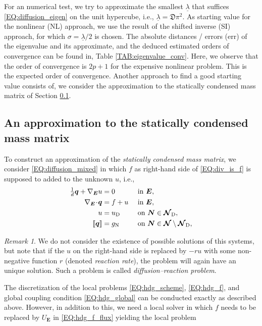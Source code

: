 \documentclass[a4paper, english, 12pt, reqno, draft]{amsart}
\theoremstyle{definition}
\theoremstyle{remark}
\newtheorem{remark}[theorem]{Remark}
\numberwithin{equation}{section}
\newcommand{\SetNode}{\ensuremath{\boldsymbol{\mathcal N}}}
\newcommand{\SetNodeDir}{\ensuremath{\SetNode_\textup D}}
\newcommand{\Edge}{{\ensuremath{\boldsymbol E}}}
\newcommand{\Node}{{\ensuremath{\boldsymbol N}}}
\newcommand{\globDim}{\ensuremath{\mathfrak D}}
\newcommand{\Nabla}{\ensuremath{\nabla_\Edge}}
\newcommand{\Div}{\ensuremath{\Nabla\!\cdot\!}}
\newcommand{\jump}[1]{{[\![ #1 ]\!]}}
\renewcommand{\vec}[1]{\ensuremath{\boldsymbol{#1}}}
\newcommand{\eigenval}{\ensuremath{\underline \lambda}}
\begin{document}
% 
For an numerical test, we try to approximate the smallest $\eigenval$ that suffices \eqref{EQ:diffusion_eigen} on the unit hypercube, i.e., $\eigenval = \globDim \pi^2$. As starting value for the nonlinear (NL) approach, we use the result of the shifted inverse (SI) approach, for which $\sigma = \eigenval / 2$ is chosen. The absolute distances / errors (err) of the eigenvalue and its approximate, and the deduced estimated orders of convergence can be found in, Table \ref{TAB:eigenvalue_conv}. Here, we observe that the order of convergence is $2p+1$ for the expensive nonlinear problem. This is the expected order of convergence. Another approach to find a good starting value consists of, we consider the approximation to the statically condensed mass matrix of Section \ref{SEC:approx_mass}.
% 
\subsection{An approximation to the statically condensed mass matrix}\label{SEC:approx_mass}
% 
To construct an approximation of the \emph{statically condensed mass matrix}, we consider \eqref{EQ:diffusion_mixed} in which $f$ as right-hand side of \eqref{EQ:div_is_f} is supposed to added to the unknown $u$, i.e.,
% 
\begin{subequations}\label{EQ:diffusion_fu_mixed}
\begin{align}
 \tfrac{1}{d} \vec q + \Nabla u & = 0 && \text{ in } \Edge,\label{EQ:primal_dual_fu}\\
 \Div \vec q & = f + u && \text{ in } \Edge,\label{EQ:div_is_u}\\
  u & = u_\textup D && \text{ on } \Node \in \SetNodeDir,\label{EQ:dir_cond_fu}\\
 \jump{\vec q} & = g_\textup N && \text{ on } \Node \in \SetNode \setminus \SetNodeDir,\label{EQ:neu_cond_fu}
\end{align}
\end{subequations}
% 
\begin{remark}\label{REM:ex_reaction}
 We do not consider the existence of possible solutions of this systems, but note that if the $u$ on the right-hand side is replaced by $- ru$ with some non-negative function $r$ (denoted \emph{reaction rate}), the problem will again have an unique solution. Such a problem is called \emph{diffusion--reaction problem}.
\end{remark}
% 
The discretization of the local problems \eqref{EQ:hdg_scheme}, \eqref{EQ:hdg_f}, and global coupling condition \eqref{EQ:hdg_global} can be conducted exactly as described above. However, in addition to this, we need a local solver in which $f$ needs to be replaced by $U_\Edge$ in \eqref{EQ:hdg_f_flux} yielding the local problem
\end{document}

